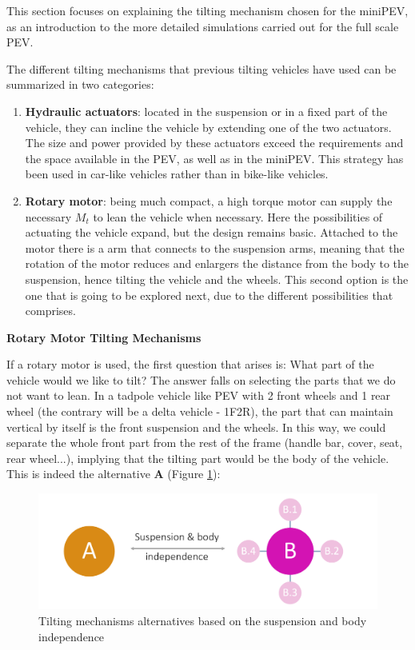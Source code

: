 This section focuses on explaining the tilting mechanism chosen for the miniPEV, as an introduction to the more detailed simulations carried out for the full scale PEV. 

The different tilting mechanisms that previous tilting vehicles have used can be summarized in two categories:
\begin{enumerate}
\item \textbf{Hydraulic actuators}: located in the suspension or in a fixed part of the vehicle, they can incline the vehicle by extending one of the two actuators. The size and power provided by these actuators exceed the requirements and the space available in the PEV, as well as in the miniPEV. This strategy has been used in car-like vehicles rather than in bike-like vehicles.

\item \textbf{Rotary motor}: being much compact, a high torque motor can supply the necessary $M_{t}$ to lean the vehicle when necessary. Here the possibilities of actuating the vehicle expand, but the design remains basic. Attached to the motor there is a arm that connects to the suspension arms, meaning that the rotation of the motor reduces and enlargers the distance from the body to the suspension, hence tilting the vehicle and the wheels. This second option is the one that is going to be explored next, due to the different possibilities that comprises.
\end{enumerate}

\newpage
\textbf{Rotary Motor Tilting Mechanisms}

If a rotary motor is used, the first question that arises is: What part of the vehicle would we like to tilt? The answer falls on selecting the parts that we do not want to lean. In a tadpole vehicle like PEV with 2 front wheels and 1 rear wheel (the contrary will be a delta vehicle - 1F2R), the part that can maintain vertical by itself is the front suspension and the wheels. In this way, we could separate the whole front part from the rest of the frame (handle bar, cover, seat, rear wheel...), implying that the tilting part would be the body of the vehicle. This is indeed the alternative \textbf{A} (Figure \ref{design_tilting}):

\begin{figure}[h!]
	\includegraphics[width=1.0\linewidth]{figs/04/Picture2}
	\caption{Tilting mechanisms alternatives based on the suspension and body independence}
	\label{design_tilting}
\end{figure}

